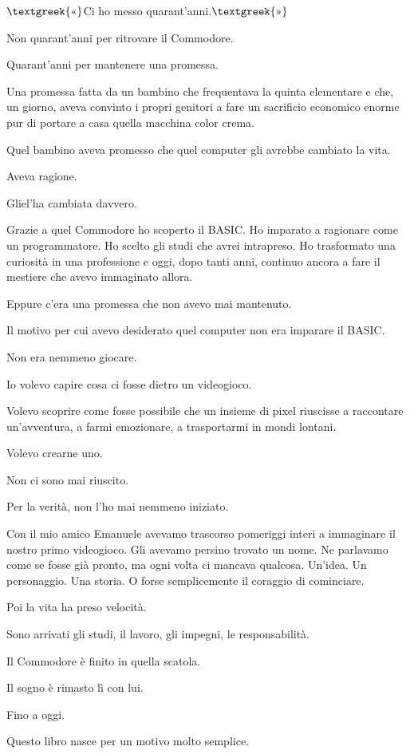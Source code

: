 \documentclass{article}
\begin{document}
$\text{\textgreek{«}}$Ci ho messo quarant'anni.$\text{\textgreek{»}}$

Non quarant'anni per ritrovare il Commodore.

Quarant'anni per mantenere una promessa.

Una promessa fatta da un bambino che frequentava la quinta elementare e che, un giorno, aveva convinto i propri genitori
a fare un sacrificio economico enorme pur di portare a casa quella macchina color crema.

Quel bambino aveva promesso che quel computer gli avrebbe cambiato la vita.

Aveva ragione.

Gliel'ha cambiata davvero.

Grazie a quel Commodore ho scoperto il BASIC. Ho imparato a ragionare come un programmatore. Ho scelto gli studi che
avrei intrapreso. Ho trasformato una curiosità in una professione e oggi, dopo tanti anni, continuo ancora a fare il
mestiere che avevo immaginato allora.

Eppure c'era una promessa che non avevo mai mantenuto.

Il motivo per cui avevo desiderato quel computer non era imparare il BASIC.

Non era nemmeno giocare.

Io volevo capire cosa ci fosse dietro un videogioco.

Volevo scoprire come fosse possibile che un insieme di pixel riuscisse a raccontare un'avventura, a farmi emozionare, a
trasportarmi in mondi lontani.

Volevo crearne uno.

Non ci sono mai riuscito.

Per la verità, non l'ho mai nemmeno iniziato.

Con il mio amico Emanuele avevamo trascorso pomeriggi interi a immaginare il nostro primo videogioco. Gli avevamo
persino trovato un nome. Ne parlavamo come se fosse già pronto, ma ogni volta ci mancava qualcosa. Un'idea. Un
personaggio. Una storia. O forse semplicemente il coraggio di cominciare.

Poi la vita ha preso velocità.

Sono arrivati gli studi, il lavoro, gli impegni, le responsabilità.

Il Commodore è finito in quella scatola.

Il sogno è rimasto lì con lui.

Fino a oggi.

Questo libro nasce per un motivo molto semplice.
\end{document}
